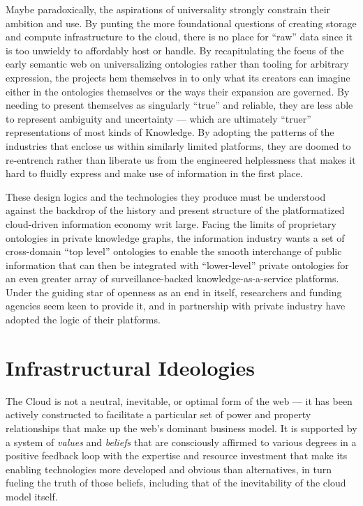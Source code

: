 \documentclass{article}
\begin{document}
Maybe paradoxically, the aspirations of universality strongly constrain
their ambition and use. By punting the more foundational questions of
creating storage and compute infrastructure to the cloud, there is no
place for ``raw'' data since it is too unwieldy to affordably host or
handle. By recapitulating the focus of the early semantic web on
universalizing ontologies rather than tooling for arbitrary expression,
the projects hem themselves in to only what its creators can imagine
either in the ontologies themselves or the ways their expansion are
governed. By needing to present themselves as singularly ``true'' and
reliable, they are less able to represent ambiguity and uncertainty ---
which are ultimately ``truer'' representations of most kinds of
Knowledge. By adopting the patterns of the industries that enclose us
within similarly limited platforms, they are doomed to re-entrench
rather than liberate us from the engineered helplessness that makes it
hard to fluidly express and make use of information in the first place.

These design logics and the technologies they produce must be understood
against the backdrop of the history and present structure of the
platformatized cloud-driven information economy writ large. Facing the
limits of proprietary ontologies in private knowledge graphs, the
information industry wants a set of cross-domain ``top level''
ontologies to enable the smooth interchange of public information that
can then be integrated with ``lower-level'' private ontologies for an
even greater array of surveillance-backed knowledge-as-a-service
platforms. Under the guiding star of openness as an end in itself,
researchers and funding agencies seem keen to provide it, and in
partnership with private industry have adopted the logic of their
platforms.

\hypertarget{infrastructural-ideologies}{%
\section{Infrastructural Ideologies}\label{infrastructural-ideologies}}

The Cloud is not a neutral, inevitable, or optimal form of the web ---
it has been actively constructed to facilitate a particular set of power
and property relationships that make up the web's dominant business
model. It is supported by a system of \emph{values} and \emph{beliefs}
that are consciously affirmed to various degrees in a positive feedback
loop with the expertise and resource investment that make its enabling
technologies more developed and obvious than alternatives, in turn
fueling the truth of those beliefs, including that of the inevitability
of the cloud model itself.
\end{document}
